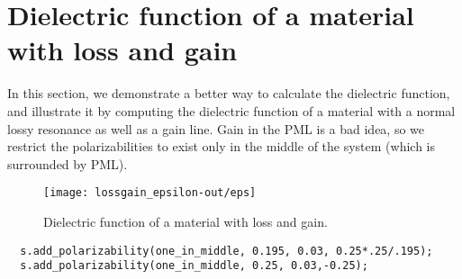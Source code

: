 \section{Dielectric function of a material with loss and gain}

\begin{comment}
#include <stdio.h>
#include <stdlib.h>
#include <signal.h>

#include <meep.h>
using namespace meep;

const double a = 10.0;
const int m = 0;
const double eps_value = 2.25;

const double pml = 1.0;
const double rmax  = 6.0/a;
const double zsize = 2*pml+10.0/a;
const double zmiddle = zsize/2.0;
const double sourceloc = zmiddle - 4.0/a;

const double r_look = 1.5/a, z_look = zmiddle, d = 1.0/a;

double eps(const vec &) { return eps_value; }
double one_in_middle(const vec &v) {
  const double midmax = r_look+2.0/a;
  const double midwid = 2.0/a;
  if (v.r() <= midmax && v.z() >= zmiddle-midwid && v.z() < zmiddle+midwid) {
    return 1;
  } else {
    return 0;
  }
}

int main(int argc, char **argv) {
  initialize mpi(argc, argv);
  deal_with_ctrl_c();
  const char *dirname = make_output_directory(__FILE__);
  master_printf("Using pml of %
  master_printf("Using an rmax of %
  structure s(volcyl(rmax + pml, zsize, a), eps);
  s.use_pml_everywhere(pml);
  s.set_output_directory(dirname);
\end{comment}

In this section, we demonstrate a better way to calculate the dielectric
function, and illustrate it by computing the dielectric function of a
material with a normal lossy resonance as well as a gain line.  Gain in the
PML is a bad idea, so we restrict the polarizabilities to exist only in the
middle of the system (which is surrounded by PML).

\begin{figure}
\label{lossgain_epsilon}
\caption{Dielectric function of a material with loss and gain.}
\texttt{[image: lossgain\_epsilon-out/eps]}
\end{figure}

\begin{verbatim}
  s.add_polarizability(one_in_middle, 0.195, 0.03, 0.25*.25/.195);
  s.add_polarizability(one_in_middle, 0.25, 0.03,-0.25);
\end{verbatim}

